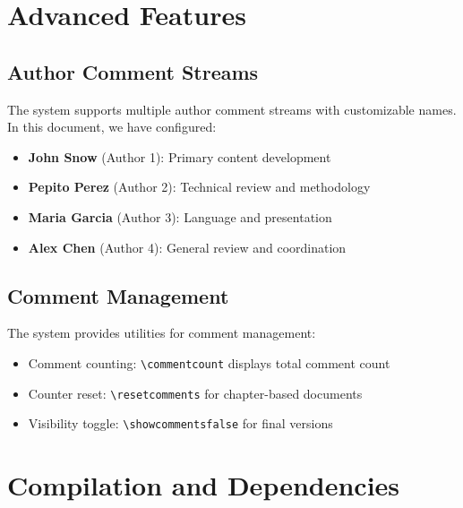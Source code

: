 \documentclass[magazine]{IEEEtran}
\begin{document}

\section{Advanced Features}

\subsection{Author Comment Streams}

The system supports multiple author comment streams with customizable names. In this document, we have configured:

\begin{itemize}
\item \textbf{John Snow} (Author 1): Primary content development
\item \textbf{Pepito Perez} (Author 2): Technical review and methodology  
\item \textbf{Maria Garcia} (Author 3): Language and presentation
\item \textbf{Alex Chen} (Author 4): General review and coordination
\end{itemize}


\subsection{Comment Management}

The system provides utilities for comment management:


\begin{itemize}
\item Comment counting: \verb|\commentcount| displays total comment count
\item Counter reset: \verb|\resetcomments| for chapter-based documents
\item Visibility toggle: \verb|\showcommentsfalse| for final versions
\end{itemize}

\section{Compilation and Dependencies}
\end{document}
